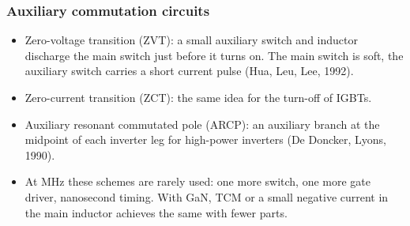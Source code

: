 \begin{frame}
	\frametitle{Auxiliary commutation circuits}
	\begin{itemize}
		\item Zero-voltage transition (ZVT): a small auxiliary switch and inductor discharge the main switch just before it turns on. The main switch is soft, the auxiliary switch carries a short current pulse (Hua, Leu, Lee, 1992).
		\item Zero-current transition (ZCT): the same idea for the turn-off of IGBTs.
		\item Auxiliary resonant commutated pole (ARCP): an auxiliary branch at the midpoint of each inverter leg for high-power inverters (De Doncker, Lyons, 1990).
		\item At MHz these schemes are rarely used: one more switch, one more gate driver, nanosecond timing. With GaN, TCM or a small negative current in the main inductor achieves the same with fewer parts.
	\end{itemize}
\end{frame}


